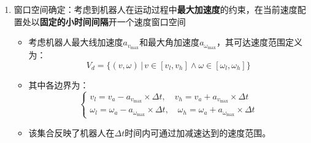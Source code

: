 \documentclass[../main.tex]{subfiles}
\begin{document}
\begin{enumerate}
\begin{itemize}
\begin{enumerate}
                        \begin{itemize}
                            \item {\small\kaishu 在速度控制模型下，机器人在$\Delta t$时间间隔内若线速度$v$与角速度$\omega$保持不变，则位置变化为：}
                            \[
                            \begin{cases}
                            x' = x - \frac{v}{\omega}\sin\theta + \frac{v}{\omega}\sin(\theta + \omega \Delta t) \\
                            y' = y + \frac{v}{\omega}\cos\theta - \frac{v}{\omega}\cos(\theta + \omega \Delta t) \\
                            \theta' = \theta + \omega \Delta t
                            \end{cases}
                            \]
                            \item {\small\kaishu 根据该模型，可定义使机器人不与障碍物相撞的可行速度集合：}
                            \[
                            V_a = \left\{(v,\omega)\, \middle|\, v \le \sqrt{2 \times dist(v,\omega) \times \dot{v}_b}\ \cup\ \omega \le \sqrt{2 \times dist(v,\omega) \times \dot{\omega}_b}\right\}
                            \]
                            \item {\small\kaishu 其中 $dist(v,\omega)$ 表示该速度对应轨迹上距离最近障碍物的距离；$\dot{v}_b$、$\dot{\omega}_b$ 分别为刹车平移与旋转加速度。}
                        \end{itemize}
                
                    \item 窗口空间确定：考虑到机器人在运动过程中\textbf{最大加速度}的约束，在当前速度配置处以\textbf{固定的小时间间隔}开一个速度窗口空间
                        \begin{itemize}
                            \item {\small\kaishu 考虑机器人最大线加速度$a_{v_{\max}}$和最大角加速度$a_{\omega_{\max}}$，其可达速度范围定义为：}
                            \[
                            V_d = \{(v,\omega)\,|\,v \in [v_l,v_h] \wedge \omega \in [\omega_l,\omega_h]\}
                            \]
                            \item {\small\kaishu 其中各边界为：}
                            \[
                            \begin{cases}
                            v_l = v_a - a_{v_{\max}} \times \Delta t, \quad v_h = v_a + a_{v_{\max}} \times \Delta t \\
                            \omega_l = \omega_a - a_{\omega_{\max}} \times \Delta t, \quad \omega_h = \omega_a + a_{\omega_{\max}} \times \Delta t
                            \end{cases}
                            \]
                            \item {\small\kaishu 该集合反映了机器人在$\Delta t$时间内可通过加减速达到的速度范围。}
                        \end{itemize}
                

\end{enumerate}
\end{itemize}
\end{enumerate}
\end{document}
